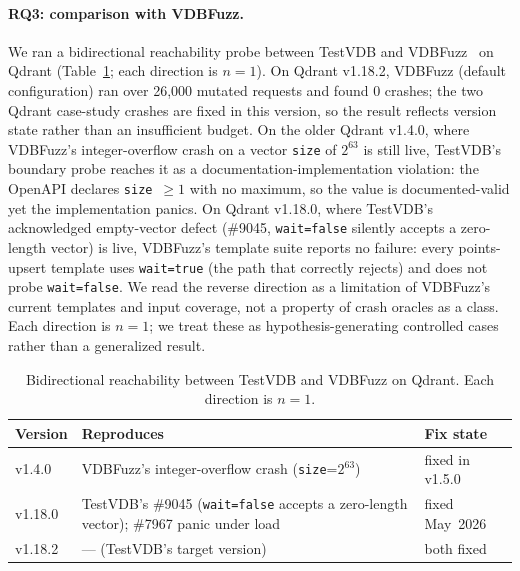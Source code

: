 \documentclass[sigconf]{acmart}
\begin{document}
\paragraph{RQ3: comparison with VDBFuzz.}
We ran a bidirectional reachability probe between TestVDB and VDBFuzz~\cite{vdbfuzz26} on Qdrant (Table~\ref{tab:versions}; each direction is $n{=}1$). On Qdrant v1.18.2, VDBFuzz (default configuration) ran over 26{,}000 mutated requests and found 0 crashes; the two Qdrant case-study crashes are fixed in this version, so the result reflects version state rather than an insufficient budget. On the older Qdrant v1.4.0, where VDBFuzz's integer-overflow crash on a vector \texttt{size} of $2^{63}$ is still live, TestVDB's boundary probe reaches it as a documentation-implementation violation: the OpenAPI declares \texttt{size}~$\geq 1$ with no maximum, so the value is documented-valid yet the implementation panics. On Qdrant v1.18.0, where TestVDB's acknowledged empty-vector defect (\#9045, \texttt{wait=false} silently accepts a zero-length vector) is live, VDBFuzz's template suite reports no failure: every points-upsert template uses \texttt{wait=true} (the path that correctly rejects) and does not probe \texttt{wait=false}. We read the reverse direction as a limitation of VDBFuzz's current templates and input coverage, not a property of crash oracles as a class. Each direction is $n{=}1$; we treat these as hypothesis-generating controlled cases rather than a generalized result.

\begin{table}[t]
\caption{Bidirectional reachability between TestVDB and VDBFuzz on Qdrant. Each direction is $n{=}1$.}
\label{tab:versions}
\small
\begin{tabular}{@{}p{}p{}p{}@{}}
\toprule
Version & Reproduces & Fix state \\
\midrule
v1.4.0 & VDBFuzz's integer-overflow crash (\texttt{size}=$2^{63}$) & fixed in v1.5.0 \\
v1.18.0 & TestVDB's \#9045 (\texttt{wait=false} accepts a zero-length vector); \#7967 panic under load & fixed May~2026 \\
v1.18.2 & --- (TestVDB's target version) & both fixed \\
\bottomrule
\end{tabular}
\end{table}
\end{document}
